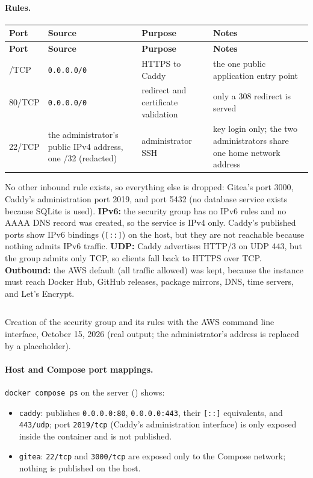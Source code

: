 \paragraph{Rules.}
\begin{tabularx}{\linewidth}{L{1.9cm}L{3.0cm}L{2.3cm}Y}
\caption{Inbound rules, IPv4 (IPv6 has no rules)\label{Table:InboundRules}}\\
\toprule \textbf{Port} & \textbf{Source} & \textbf{Purpose} & \textbf{Notes}\\ \midrule
\endfirsthead
\toprule \textbf{Port} & \textbf{Source} & \textbf{Purpose} & \textbf{Notes}\\ \midrule
\endhead \bottomrule {}/TCP & \texttt{0.0.0.0/0} & HTTPS to Caddy & the one public application entry point\\
80/TCP & \texttt{0.0.0.0/0} & redirect and certificate validation & only a 308 redirect is served\\
22/TCP & the administrator's public IPv4 address, one /32 (redacted) & administrator SSH & key login only; the two administrators share one home network address\\
\end{tabularx}
No other inbound rule exists, so everything else is dropped: Gitea's port
3000, Caddy's administration port 2019, and port 5432 (no database service
exists because SQLite is used). \textbf{IPv6:} the security group has no IPv6
rules and no AAAA DNS record was created, so the service is IPv4 only. Caddy's
published ports show IPv6 bindings (\texttt{[::]}) on the host, but they are not
reachable because nothing admits IPv6 traffic. \textbf{UDP:} Caddy advertises
HTTP/3 on UDP 443, but the group admits only TCP, so clients fall back to
HTTPS over TCP. \textbf{Outbound:} the AWS default (all traffic allowed) was
kept, because the instance must reach Docker Hub, GitHub releases, package
mirrors, DNS, time servers, and Let's Encrypt.

\begin{longlisting}
\inputminted[fontsize=\scriptsize]{text}{evidence/08-aws-security-group-created-ssw590-g1-gitea-2026-10-15.txt}
\caption{Creation of the security group and its rules with the AWS command line interface, October 15, 2026 (real output; the administrator's address is replaced by a placeholder).}
\label{Listing:E08}
\end{longlisting}

\paragraph{Host and Compose port mappings.}
\texttt{docker compose ps} on the server () shows:
\begin{itemize}[nosep]
  \item \texttt{caddy}: publishes \texttt{0.0.0.0:80}, \texttt{0.0.0.0:443}, their \texttt{[::]} equivalents, and \texttt{443/udp}; port \texttt{2019/tcp} (Caddy's administration interface) is only exposed inside the container and is not published.
  \item \texttt{gitea}: \texttt{22/tcp} and \texttt{3000/tcp} are exposed only to the Compose network; nothing is published on the host.
\end{itemize}

